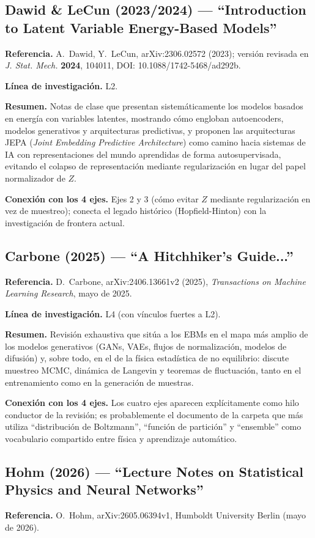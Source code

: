\documentclass[12pt]{article}
\begin{document}
\subsection{Dawid \& LeCun (2023/2024) --- ``Introduction to Latent Variable Energy-Based Models''}
\textbf{Referencia.} A.~Dawid, Y.~LeCun, arXiv:2306.02572 (2023); versión revisada en \textit{J. Stat. Mech.} \textbf{2024}, 104011, DOI: 10.1088/1742-5468/ad292b. \cite{dawid2024}

\textbf{Línea de investigación.} L2.

\textbf{Resumen.} Notas de clase que presentan sistemáticamente los modelos basados en energía con variables latentes, mostrando cómo engloban autoencoders, modelos generativos y arquitecturas predictivas, y proponen las arquitecturas JEPA (\emph{Joint Embedding Predictive Architecture}) como camino hacia sistemas de IA con representaciones del mundo aprendidas de forma autosupervisada, evitando el colapso de representación mediante regularización en lugar del papel normalizador de $Z$.

\textbf{Conexión con los 4 ejes.} Ejes 2 y 3 (cómo evitar $Z$ mediante regularización en vez de muestreo); conecta el legado histórico (Hopfield-Hinton) con la investigación de frontera actual.

\subsection{Carbone (2025) --- ``A Hitchhiker's Guide...''}
\textbf{Referencia.} D.~Carbone, arXiv:2406.13661v2 (2025), \textit{Transactions on Machine Learning Research}, mayo de 2025. \cite{carbone2025}

\textbf{Línea de investigación.} L4 (con vínculos fuertes a L2).

\textbf{Resumen.} Revisión exhaustiva que sitúa a los EBMs en el mapa más amplio de los modelos generativos (GANs, VAEs, flujos de normalización, modelos de difusión) y, sobre todo, en el de la física estadística de no equilibrio: discute muestreo MCMC, dinámica de Langevin y teoremas de fluctuación, tanto en el entrenamiento como en la generación de muestras.

\textbf{Conexión con los 4 ejes.} Los cuatro ejes aparecen explícitamente como hilo conductor de la revisión; es probablemente el documento de la carpeta que más utiliza ``distribución de Boltzmann'', ``función de partición'' y ``ensemble'' como vocabulario compartido entre física y aprendizaje automático.

\subsection{Hohm (2026) --- ``Lecture Notes on Statistical Physics and Neural Networks''}
\textbf{Referencia.} O.~Hohm, arXiv:2605.06394v1, Humboldt University Berlin (mayo de 2026). \cite{hohm2026}
\end{document}
